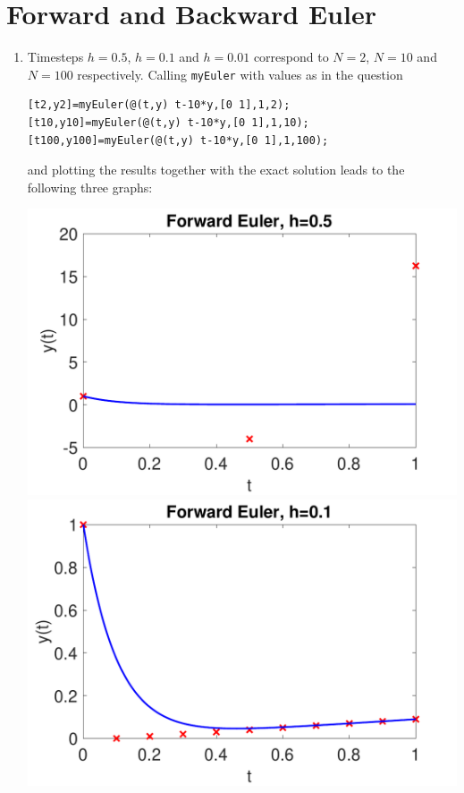 \documentclass[a4paper,11pt]{article}
\newcommand{\matlab}[1]{\texttt{#1}}
\begin{document}


\section{Forward and Backward Euler}

\begin{enumerate}
  \item Timesteps $h=0.5$, $h=0.1$ and $h=0.01$ correspond to $N=2$, $N=10$ and $N=100$ respectively.
    Calling \matlab{myEuler} with values as in the question 
\begin{lstlisting}
[t2,y2]=myEuler(@(t,y) t-10*y,[0 1],1,2);
[t10,y10]=myEuler(@(t,y) t-10*y,[0 1],1,10);
[t100,y100]=myEuler(@(t,y) t-10*y,[0 1],1,100);
\end{lstlisting}
    and plotting the results together with the exact solution leads to the following three graphs:
    \begin{center}
      \includegraphics[scale=0.3]{images/Q1a_1.pdf}
      \includegraphics[scale=0.3]{images/Q1a_2.pdf}

\end{center}
\end{enumerate}
\end{document}
